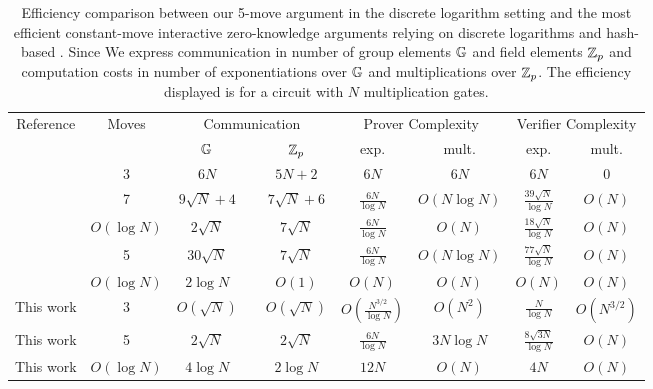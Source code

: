 \begin{table}
\centering
\begin{tabular}{|c|c|ccc|cc|cc|}
\hline
Reference & Moves &\multicolumn{3}{c|}{ Communication}&\multicolumn{2}{c|}{Prover Complexity}&\multicolumn{2}{c|}{Verifier Complexity}\\
&& $\mathbb{G}$ &\;\;& $\mathbb{Z}_p$ & exp. & mult. & exp. & mult. \\
\hline
\cite{Cramer1998a}& 3& $6N$  && $5N +2$ & $6N $ & $6N$& $6N$ & $0$ \\%
\cite{Groth2009b}& 7 &$9 \sqrt{N}+4$&&$7\sqrt{N}+6$&$\frac{6N}{\log{N}}$ &$O\left(N \log N\right)$&$\frac{39\sqrt{N}}{\log{N}}$&$O\left(N\right)$ \\
\cite{Groth2009b}& $O(\log{N})$ &$2\sqrt{N}$&&$7\sqrt{N}$&$\frac{6N}{\log{N}}$ & $O(N)$ &  $\frac{18\sqrt{N}}{\log{N}}$&$O\left(N\right)$\\
\cite{Seo2011a}&5&$30\sqrt{N}$ &&$7\sqrt{N}$&$\frac{6N}{\log{N}}$  &$O\left(N\log N\right)$& $\frac{77\sqrt{N}}{\log{N}}$&$O\left(N\right)$\\
\cite{BunzBBPWM18} & $O(\log{N})$  %
& $2\log{N}$ &&$O(1)$& $ O(N)$  & $O(N)$ & $O(N)$&$O(N)$ \\
\hline
This work & 3& $O(\sqrt{N})$&&$O(\sqrt{N})$&$O(\frac{N^{3/2}}{\log{N}})$& $O(N^2)$ &$\frac{N}{\log N}$ & $O(N^{3/2})$ \\
\hline
This work & 5& $2\sqrt{N}$&&$2\sqrt{N}$&$\frac{6N}{\log{N}}$& $3N \log{N}$ &$\frac{8\sqrt{3N}}{\log{N}}$ & $O(N)$ \\
\hline
This work & $O(\log{N})$  %
& $4\log{N}$ &&$2\log{N}$& $ 12N$  & $O(N)$ & $4N$&$O(N)$ \\
\hline
\end{tabular}
\vspace{.2cm}
\caption{Efficiency comparison between our 5-move argument in the discrete logarithm setting and the most efficient constant-move interactive zero-knowledge arguments relying on discrete logarithms and hash-based . Since We express communication in number of group elements $\mathbb{G}$ and field elements $\mathbb{Z}_p$ and computation costs in number of exponentiations over $\mathbb{G}$ and multiplications over $\mathbb{Z}_p$. The efficiency displayed is for a circuit with $N$ multiplication gates.\label{table:previous}} 
\end{table}

